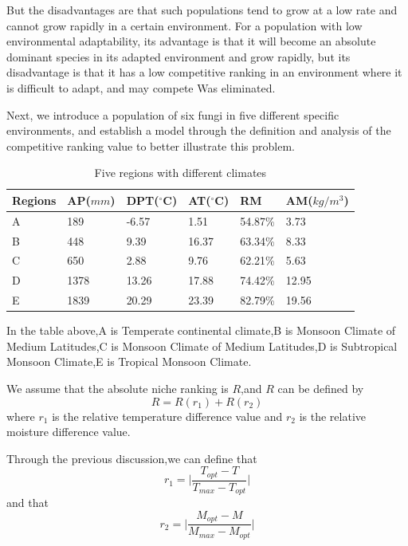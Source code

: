 \documentclass{mcmthesis}
\begin{document}
But the disadvantages are that such populations tend to grow at a low rate and cannot grow rapidly in a certain environment. For a population with low environmental adaptability, its advantage is that it will become an absolute dominant species in its adapted environment and grow rapidly, but its disadvantage is that it has a low competitive ranking in an environment where it is difficult to adapt, and may compete Was eliminated. 

Next, we introduce a population of six fungi in five different specific environments, and establish a model through the definition and analysis of the competitive ranking value to better illustrate this problem.

\begin{table}[h]
	\centering
	\caption{Five regions with different climates}
	\begin{tabular}{p{}p{}p{}p{}p{}p{}}
		\hline
		Regions&AP($mm$)&DPT($^{\circ}$C)&AT($^{\circ}$C)&RM&AM($kg/m^{3}$)\\
		\hline
		A & 189 &-6.57 & 1.51 & 54.87\% & 3.73\\
		B & 448 &9.39  & 16.37& 63.34\% & 8.33\\
		C & 650 &2.88  & 9.76 & 62.21\% & 5.63\\
		D & 1378 &13.26 & 17.88& 74.42\% & 12.95\\
		E & 1839 &20.29 & 23.39& 82.79\% & 19.56\\
		\hline
	\end{tabular}
\end{table}
In the table above,A is Temperate continental climate,B is Monsoon Climate of Medium Latitudes,C is Monsoon Climate of Medium Latitudes,D is Subtropical Monsoon Climate,E is Tropical Monsoon Climate.

We assume that the absolute niche ranking is $R$,and $R$ can be defined by
\begin{equation}
	R=R(r_{1})+R(r_{2})
\end{equation}
where $r_{1}$ is the relative temperature difference value and $r_{2}$ is the relative moisture difference value.

Through the previous discussion,we can define that
\begin{equation}
	r_{1}=\lvert{\frac{T_{opt}-T}{T_{max}-T_{opt}}}\lvert
\end{equation}
and that
\begin{equation}
	r_{2}=\lvert{\frac{M_{opt}-M}{M_{max}-M_{opt}}}\lvert
\end{equation}
\end{document}
